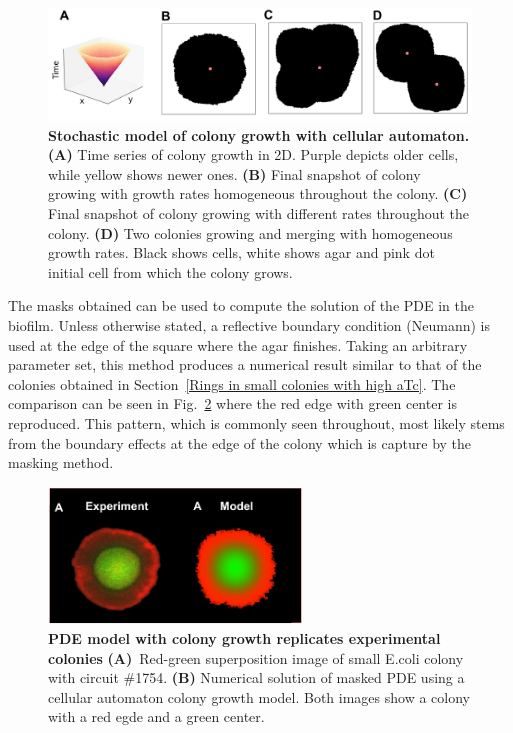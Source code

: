 \begin{figure}[H]
    \centering

    \includegraphics[width=1\textwidth]{chapters/Chapter 3/cas}
    \caption{\textbf{Stochastic model of colony growth with cellular automaton.} \textbf{(A)} Time series of colony growth in 2D. Purple depicts older cells, while yellow shows newer ones. \textbf{(B)} Final snapshot of colony growing with growth rates homogeneous throughout the colony. \textbf{(C)} Final snapshot of colony growing with different rates throughout the colony. \textbf{(D)} Two colonies growing and merging with homogeneous growth rates. Black shows cells, white shows agar and pink dot initial cell from which the colony grows.   }
    \label{cas}
\end{figure}
The masks obtained can be used to compute the solution of the PDE in the biofilm.
Unless otherwise stated, a reflective boundary condition (Neumann) is used at the edge of the square where the agar finishes.
Taking an arbitrary parameter set, this method produces a numerical result similar to that of the colonies obtained in Section~\ref{Rings in small colonies with high aTc}.
The comparison can be seen in Fig.~\ref{small colony experiment vs model} where the red edge with green center is reproduced.
This pattern, which is commonly seen throughout, most likely stems from the boundary effects at the edge of the colony which is capture by the masking method.

\begin{figure}[H]
    \centering

    \includegraphics[width=0.6\textwidth]{chapters/Chapter 3/small colony experiment vs model}
    \caption{ \textbf{PDE model with colony growth replicates experimental colonies} \textbf{(A)}~Red-green superposition image of small E.coli colony with circuit \#1754.  \textbf{(B)} Numerical solution of masked PDE using a cellular automaton colony growth model. Both images show a colony with a red egde and a green center.}
    \label{small colony experiment vs model}
\end{figure}

